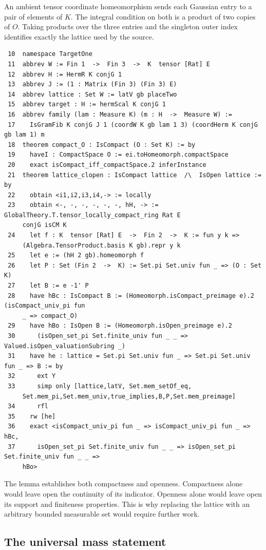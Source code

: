 \documentclass[12pt,letterpaper]{article}
\begin{document}
An ambient tensor coordinate homeomorphism sends each Gaussian entry to a pair of elements of $K$. The integral condition on both is a product of two copies of $O$. Taking products over the three entries and the singleton outer index identifies exactly the lattice used by the source.
\par
{\fontsize{8.8}{10.5}\selectfont\begin{verbatim}
 10  namespace TargetOne
 11  abbrev W := Fin 1  ->  Fin 3  ->  K  tensor [Rat] E
 12  abbrev H := HermR K conjG 1
 13  abbrev J := (1 : Matrix (Fin 3) (Fin 3) E)
 14  abbrev lattice : Set W := latV gb placeTwo
 15  abbrev target : H := hermScal K conjG 1
 16  abbrev family (lam : Measure K) (m : H  ->  Measure W) :=
 17    IsGramFib K conjG J 1 (coordW K gb lam 1 3) (coordHerm K conjG gb lam 1) m
 18  theorem compact_O : IsCompact (O : Set K) := by
 19    haveI : CompactSpace O := ei.toHomeomorph.compactSpace
 20    exact isCompact_iff_compactSpace.2 inferInstance
 21  theorem lattice_clopen : IsCompact lattice  /\  IsOpen lattice := by
 22    obtain <i1,i2,i3,i4,-> := locally
 23    obtain <-, -, -, -, -, -, hH, -> := GlobalTheory.T.tensor_locally_compact_ring Rat E
     conjG isCM K
 24    let f : K  tensor [Rat] E  ->  Fin 2  ->  K := fun y k =>
     (Algebra.TensorProduct.basis K gb).repr y k
 25    let e := (hH 2 gb).homeomorph f
 26    let P : Set (Fin 2  ->  K) := Set.pi Set.univ fun _ => (O : Set K)
 27    let B := e -1' P
 28    have hBc : IsCompact B := (Homeomorph.isCompact_preimage e).2 (isCompact_univ_pi fun
     _ => compact_O)
 29    have hBo : IsOpen B := (Homeomorph.isOpen_preimage e).2
 30      (isOpen_set_pi Set.finite_univ fun _ _ => Valued.isOpen_valuationSubring _)
 31    have he : lattice = Set.pi Set.univ fun _ => Set.pi Set.univ fun _ => B := by
 32      ext Y
 33      simp only [lattice,latV, Set.mem_setOf_eq,
     Set.mem_pi,Set.mem_univ,true_implies,B,P,Set.mem_preimage]
 34      rfl
 35    rw [he]
 36    exact <isCompact_univ_pi fun _ => isCompact_univ_pi fun _ => hBc,
 37      isOpen_set_pi Set.finite_univ fun _ _ => isOpen_set_pi Set.finite_univ fun _ _ =>
     hBo>
\end{verbatim}}
The lemma establishes both compactness and openness. Compactness alone would leave open the continuity of its indicator. Openness alone would leave open its support and finiteness properties. This is why replacing the lattice with an arbitrary bounded measurable set would require further work.
\clearpage{}\subsection*{The universal mass statement}
\end{document}
